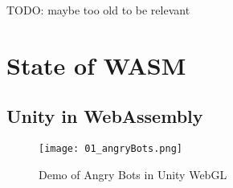    TODO: maybe too old to be relevant

\section{State of WASM}

    \subsection{Unity in WebAssembly}


    \begin{figure}[htbp]
        \centering
        \texttt{[image: 01\_angryBots.png]}
        \caption{Demo of Angry Bots in Unity WebGL}\label{fig:unity}
    \end{figure}
